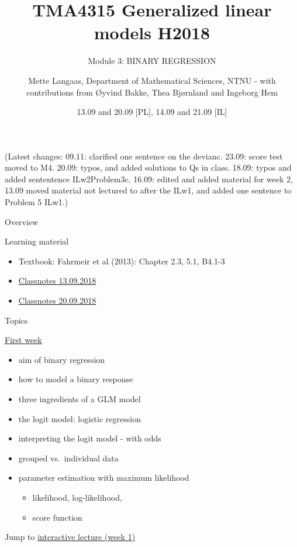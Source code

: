 \documentclass[
  ignorenonframetext,
]{beamer}
\title{TMA4315 Generalized linear models H2018}
\subtitle{Module 3: BINARY REGRESSION}
\author{Mette Langaas, Department of Mathematical Sciences, NTNU - with
contributions from Øyvind Bakke, Thea Bjørnland and Ingeborg Hem}
\date{13.09 and 20.09 {[}PL{]}, 14.09 and 21.09 {[}IL{]}}
\providecommand{\tightlist}{%
  \setlength{\itemsep}{0pt}\setlength{\parskip}{0pt}}
\begin{document}
\frame{\titlepage}

\begin{frame}
(Latest changes: 09.11: clarified one sentence on the devianc. 23.09:
score test moved to M4. 20.09: typos, and added solutions to Qs in
class. 18.09: typos and added sententence ILw2Problem3c. 16.09: edited
and added material for week 2, 13.09 moved material not lectured to
after the ILw1, and added one sentence to Problem 5 ILw1.)
\end{frame}

\begin{frame}{Overview}
\protect\hypertarget{overview}{}
\begin{block}{Learning material}
\protect\hypertarget{learning-material}{}
\begin{itemize}
\tightlist
\item
  Textbook: Fahrmeir et al (2013): Chapter 2.3, 5.1, B4.1-3
\item
  \href{https://www.math.ntnu.no/emner/TMA4315/2018h/TMA4315M3H20180913.pdf}{Classnotes
  13.09.2018}
\item
  \href{https://www.math.ntnu.no/emner/TMA4315/2018h/TMA4315M3H20180920.pdf}{Classnotes
  20.09.2018}
\end{itemize}
\end{block}
\end{frame}

\begin{frame}
\begin{block}{Topics}
\protect\hypertarget{topics}{}
\begin{block}{\protect\hyperlink{firstweek}{First week}}
\protect\hypertarget{first-week}{}
\begin{itemize}
\tightlist
\item
  aim of binary regression
\item
  how to model a binary response
\item
  three ingredients of a GLM model
\item
  the logit model: logistic regression
\item
  interpreting the logit model - with odds
\item
  grouped vs.~individual data
\item
  parameter estimation with maximum likelihood

  \begin{itemize}
  \tightlist
  \item
    likelihood, log-likelihood,
  \item
    score function
  \end{itemize}
\end{itemize}

Jump to \protect\hyperlink{ILw1}{interactive lecture (week 1)}
\end{block}
\end{block}
\end{frame}
\end{document}
